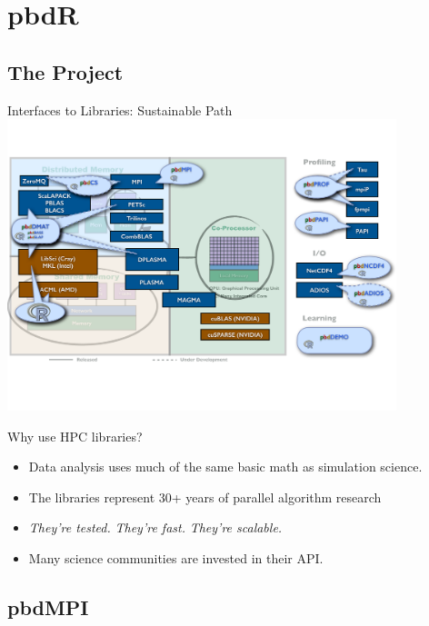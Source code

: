\section{pbdR}

\subsection{The Project}

\begin{frame}{\pbdR Interfaces to Libraries: Sustainable Path}
  \vspace{-1ex}
  \centering\includegraphics[trim=0cm 5cm 0cm 3cm,clip=true,width=0.85\textwidth]
  {../common/pics/hardware/ParallelHardware27.pdf}
  \scriptsize
  \begin{block}{Why use HPC libraries?}
    \begin{itemize}[<+-|alert@+>]
    \item Data analysis uses much of the same basic math as simulation science.
    \item The libraries represent 30+ years of parallel algorithm research
    \item \emph{They're tested.} \emph{They're
        fast.}  \emph{They're scalable.}
    \item Many science communities are invested in their API.
    \end{itemize}
  \end{block}
\end{frame}

\subsection{pbdMPI}

